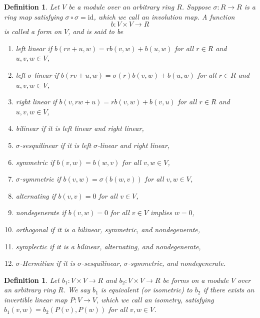 \documentclass[10pt]{book}
\theoremstyle{bookplain}
\theoremstyle{bookdefinition}
\newtheorem{definition}[theorem]{Definition}
\theoremstyle{bookremark}
\begin{document}
\begin{definition}Let $V$ be a module over an arbitrary ring $R$. Suppose $\sigma:R\rightarrow R$ is a ring map satisfying $\sigma\circ\sigma=\mathrm{id}$, which we call an \textit{involution} map. A function
    \[b:V\times V\rightarrow R\]
    is called a \textit{form} on $V$, and is said to be
    \begin{enumerate}
        \item \textit{left linear} if $b(rv+u,w)=rb(v,w)+b(u,w)$ for all $r\in R$ and $u,v,w\in V$,
        \item \textit{left $\sigma$-linear} if $b(rv+u,w)=\sigma(r)b(v,w)+b(u,w)$ for all $r\in R$ and $u,v,w\in V$,
        \item \textit{right linear} if $b(v,rw+u)=rb(v,w)+b(v,u)$ for all $r\in R$ and $u,v,w\in V$,
        \item \textit{bilinear} if it is left linear and right linear,
        \item \textit{$\sigma$-sesquilinear} if it is left $\sigma$-linear and right linear,
        \item \textit{symmetric} if $b(v, w)=b(w, v)$ for all $v,w\in V$,
        \item \textit{$\sigma$-symmetric} if $b(v, w)=\sigma(b(w, v))$ for all $v,w\in V$,
        \item \textit{alternating} if $b(v, v)=0$ for all $v\in V$,
        \item \textit{nondegenerate} if $b(v, w)=0$ for all $v\in V$ implies $w=0$,
        \item \textit{orthogonal} if it is a bilinear, symmetric, and nondegenerate,
        \item \textit{symplectic} if it is a bilinear, alternating, and nondegenerate,
        \item \textit{$\sigma$-Hermitian} if it is $\sigma$-sesquilinear, $\sigma$-symmetric, and nondegenerate.
    \end{enumerate}
\end{definition}
\begin{definition}Let $b_1:V\times V\rightarrow R$ and $b_2:V\times V\rightarrow R$ be forms on a module $V$ over an arbitrary ring $R$. We say $b_1$ is \textit{equivalent} (or \textit{isometric}) to $b_2$ if there exists an invertible linear map $P:V\rightarrow V$, which we call an \textit{isometry}, satisfying $b_1(v,w)=b_2(P(v),P(w))$ for all $v,w\in V$. 
\end{definition}
\end{document}
